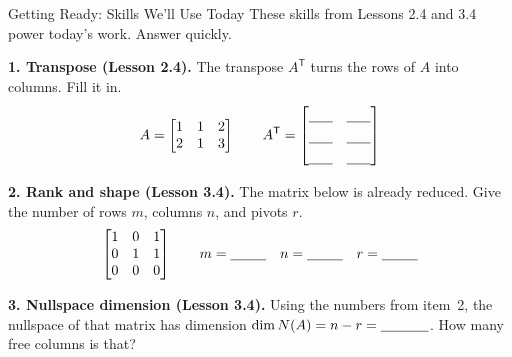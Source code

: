 \documentclass[10pt]{article}
\newcommand{\T}{\mathsf{T}}
\begin{document}
\namedateperiod

\vspace{0.12in}

\begin{notesbox}{Getting Ready: Skills We'll Use Today}
\small These skills from Lessons 2.4 and 3.4 power today's work. Answer quickly.

\vspace{4pt}
\textbf{1. Transpose (Lesson 2.4).} The transpose $A^{\T}$ turns the rows of $A$ into columns. Fill it in.
\[
  A=\begin{bmatrix} 1 & 1 & 2 \\ 2 & 1 & 3 \end{bmatrix}
  \qquad
  A^{\T}=\begin{bmatrix}
    \rule{0pt}{1.1em}\blank{0.6cm} & \blank{0.6cm} \\[3pt]
    \blank{0.6cm} & \blank{0.6cm} \\[3pt]
    \blank{0.6cm} & \blank{0.6cm}
  \end{bmatrix}
\]

\vspace{4pt}
\textbf{2. Rank and shape (Lesson 3.4).} The matrix below is already reduced. Give the number of rows $m$,
columns $n$, and pivots $r$.
\[
  \begin{bmatrix} 1 & 0 & 1 \\ 0 & 1 & 1 \\ 0 & 0 & 0 \end{bmatrix}
  \qquad
  m=\blank{0.9cm}\quad n=\blank{0.9cm}\quad r=\blank{0.9cm}
\]

\vspace{4pt}
\textbf{3. Nullspace dimension (Lesson 3.4).} Using the numbers from item~2, the nullspace of that matrix
has dimension $\dim N(A)=n-r=\blank{1.2cm}$. How many free columns is that? \blank{1.0cm}
\end{notesbox}
\end{document}
